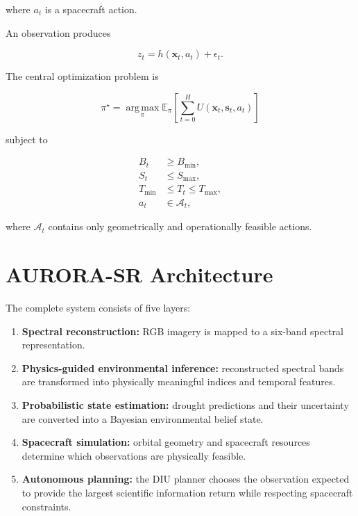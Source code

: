 \documentclass[11pt,a4paper]{article}
\newcommand{\E}{\mathbb{E}}
\newcommand{\vect}[1]{\bm{#1}}
\newcommand{\argmax}{\operatorname*{arg\,max}}
\begin{document}
where $a_t$ is a spacecraft action.

An observation produces

\begin{equation}
z_t
=
h(\vect{x}_t,a_t)
+
\epsilon_t.
\end{equation}

The central optimization problem is

\begin{equation}
\boxed{
\pi^\star
=
\argmax_{\pi}
\E_\pi
\left[
\sum_{t=0}^{H}
U(\vect{x}_t,\vect{s}_t,a_t)
\right]
}
\end{equation}

subject to

\begin{align}
B_t &\geq B_{\min},\\
S_t &\leq S_{\max},\\
T_{\min} &\leq T_t \leq T_{\max},\\
a_t &\in\mathcal{A}_t,
\end{align}

where $\mathcal A_t$ contains only geometrically and operationally
feasible actions.


\section{AURORA-SR Architecture}

The complete system consists of five layers:

\begin{enumerate}[leftmargin=*]

\item \textbf{Spectral reconstruction:}
RGB imagery is mapped to a six-band spectral representation.

\item \textbf{Physics-guided environmental inference:}
reconstructed spectral bands are transformed into physically meaningful
indices and temporal features.

\item \textbf{Probabilistic state estimation:}
drought predictions and their uncertainty are converted into a
Bayesian environmental belief state.

\item \textbf{Spacecraft simulation:}
orbital geometry and spacecraft resources determine which observations
are physically feasible.

\item \textbf{Autonomous planning:}
the DIU planner chooses the observation expected to provide the largest
scientific information return while respecting spacecraft constraints.

\end{enumerate}
\end{document}
